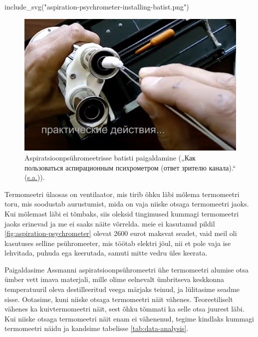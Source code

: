 \documentclass[
  12pt,
  a4paper,
  onecolumn, twoside]{article}
\newenvironment{Shaded}{\begin{snugshade}}{\end{snugshade}}
\newcommand{\FunctionTok}[1]{\textcolor[rgb]{0.00,0.00,0.00}{#1}}
\newcommand{\NormalTok}[1]{#1}
\newcommand{\StringTok}[1]{\textcolor[rgb]{0.31,0.60,0.02}{#1}}
\begin{document}
\begin{Shaded}
\begin{Highlighting}[numbers=left,,]
\FunctionTok{include\_svg}\NormalTok{(}\StringTok{"aspiration{-}psychrometer{-}installing{-}batist.png"}\NormalTok{)}
\end{Highlighting}
\end{Shaded}

\begin{figure}
\includegraphics[width=\textwidth,height=\textheight,keepaspectratio=true]{aspiration-psychrometer-installing-batist} \caption{Aspiratsioonpsühromeetrisse batisti paigaldamine ({„Как пользоваться аспирационным психрометром (ответ зрителю канала).``} (\protect\hyperlink{ref-aspiration_psychrometer_ru}{s.a.})).}\label{fig:aspiration-psychrometer-installing-batist}
\end{figure}

Termomeetri ülaosas on ventilaator, mis tirib õhku läbi mõlema termomeetri toru, mis soodustab aurustumist, mida on vaja niiske otsaga termomeetri jaoks. Kui mõlemast läbi ei tõmbaks, siis oleksid tingimused kummagi termomeetri jaoks erinevad ja me ei saaks näite võrrelda. meie ei kasutanud pildil \ref{fig:aspiration-psychrometer} olevat 2600 eurot maksvat seadet, vaid meil oli kasutuses selline psühromeeter, mis töötab elektri jõul, nii et pole vaja ise lehvitada, puhuda ega keerutada, samuti mitte vedru üles keerata.

Paigaldasime Assmanni aspiratsioonpsühromeetri ühe termomeetri alumise otsa ümber vett imava materjali, mille olime eelnevalt ümbritseva keskkonna temperatuuril oleva destilleeritud veega märjaks teinud, ja lülitasime seadme sisse. Ootasime, kuni niiske otsaga termomeetri näit vähenes. Teoreetiliselt vähenes ka kuivtermomeetri näit, sest õhku tõmmati ka selle otsa juurest läbi. Kui niiske otsaga termomeetri näit enam ei vähenenud, tegime kindlaks kummagi termomeetri näidu ja kandsime tabelisse \ref{tab:data-analysis}.
\end{document}
